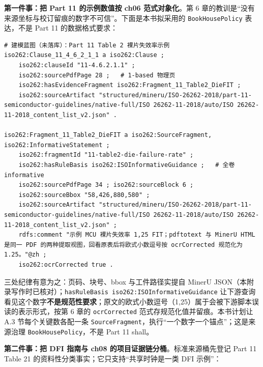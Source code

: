 \textbf{第一件事：把 Part 11 的示例数值按 ch06 范式对象化}。第 6 章的教训是“没有来源坐标与校订留痕的数字不可信”。下面是本书拟采用的 \nolinkurl{BookHousePolicy} 表达，不是 Part 11 的数据格式要求：

\nopagebreak[4]
\begin{codebox}
\begin{Verbatim}[fontsize=\small,breaklines=true,breakanywhere=true,breaksymbolleft={},breaksymbolright={}]
# 建模蓝图（未落库）：Part 11 Table 2 裸片失效率示例
iso262:Clause_11_4_6_2_1_1 a iso262:Clause ;
    iso262:clauseId "11-4.6.2.1.1" ;
    iso262:sourcePdfPage 28 ;   # 1-based 物理页
    iso262:hasEvidenceFragment iso262:Fragment_11_Table2_DieFIT ;
    iso262:sourceArtifact "structured/mineru/ISO-26262-2018/part-11-semiconductor-guidelines/native-full/ISO 26262-11-2018/auto/ISO 26262-11-2018_content_list_v2.json" .

iso262:Fragment_11_Table2_DieFIT a iso262:SourceFragment, iso262:InformativeStatement ;
    iso262:fragmentId "11-table2-die-failure-rate" ;
    iso262:hasRuleBasis iso262:ISOInformativeGuidance ;   # 全卷 informative
    iso262:sourcePdfPage 34 ; iso262:sourceBlock 6 ;
    iso262:sourceBbox "58,426,880,580" ;
    iso262:sourceArtifact "structured/mineru/ISO-26262-2018/part-11-semiconductor-guidelines/native-full/ISO 26262-11-2018/auto/ISO 26262-11-2018_content_list_v2.json" ;
    rdfs:comment "示例 MCU 裸片失效率 1,25 FIT；pdftotext 与 MinerU HTML 是同一 PDF 的两种提取视图，回看原表后将欧式小数逗号按 ocrCorrected 规范化为 1.25。"@zh ;
    iso262:ocrCorrected true .
\end{Verbatim}
\end{codebox}

三处纪律有意为之：页码、块号、bbox 与工件路径实提自 MinerU JSON（本附录写作时已核对）；\allowbreak{}\texttt{has\allowbreak{}Rule\allowbreak{}Basis \allowbreak{}iso262:\allowbreak{}ISOInformative\allowbreak{}Guidance}\allowbreak{} 让下游查询看见这个数字\textbf{不是规范性要求}；原文的欧式小数逗号（1,25）属于会被下游脚本误读的表示形式，按第 6 章的 \nolinkurl{ocrCorrected} 范式存规范化值并留痕。本书计划让 A.3 节每个关键数各配一条 \nolinkurl{SourceFragment}，执行“一个数字一个锚点”；这是来源治理 \nolinkurl{BookHousePolicy}，不是 Part 11 shall。

\textbf{第二件事：把 DFI 指南与 ch08 的项目证据链分桶}。标准来源桶先登记 Part 11 Table 21 的资料性分类事实；它只支持“共享时钟是一类 DFI 示例”：

